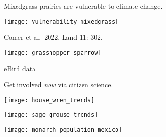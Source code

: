 \documentclass[t]{beamer}
\begin{document}
\begin{frame}{Mixedgrass prairies are vulnerable to climate change.}

\centering
\texttt{[image: vulnerability\_mixedgrass]}

\tinyfill Comer et al.\ 2022. Land 11: 302.
\end{frame}

\begin{frame}

\texttt{[image: grasshopper\_sparrow]}

\tinyfill eBird data
\end{frame}

{
\begin{frame}[b,plain]{Get involved \textit{now} via citizen science.}
\end{frame}
}


\begin{frame}
\texttt{[image: house\_wren\_trends]}
\end{frame}


\begin{frame}
\texttt{[image: sage\_grouse\_trends]}
\end{frame}

\begin{frame}
\texttt{[image: monarch\_population\_mexico]}
\end{frame}
\end{document}
